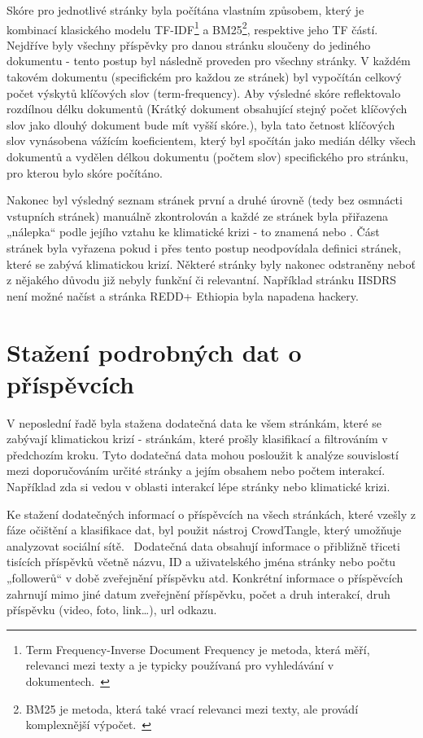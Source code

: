     Skóre pro jednotlivé stránky byla počítána vlastním způsobem, který je kombinací klasického modelu TF-IDF\footnote{Term Frequency-Inverse Document Frequency je metoda, která měří, relevanci mezi texty a je typicky používaná pro vyhledávání v dokumentech.~\citep{ullman2011mining}} a BM25\footnote{BM25 je metoda, která také vrací relevanci mezi texty, ale provádí komplexnější výpočet.~\citep{article}}, respektive jeho TF částí. Nejdříve byly všechny příspěv\-ky pro danou stránku sloučeny do jediného dokumentu - tento postup byl následně proveden pro všechny stránky. V každém takovém dokumentu (specifickém pro každou ze stránek) byl vypočítán celkový počet výskytů klíčových slov (term-frequency). Aby výsledné skóre reflektovalo rozdílnou délku dokumentů (Krátký dokument obsahující stejný počet klíčových slov jako dlouhý dokument bude mít vyšší skóre.), byla tato četnost klíčových slov vynásobena vážícím koeficientem, který byl spočítán jako medián délky všech dokumentů a vydělen délkou dokumentu (počtem slov) specifického pro stránku, pro kterou bylo skóre počítáno. 
    
    Nakonec byl výsledný seznam stránek první a druhé úrovně (tedy bez osmnácti vstupních stránek) manuálně zkontrolován a každé ze stránek byla přiřazena „nálepka“ podle jejího vztahu ke klimatické krizi - to znamená  nebo . Část stránek byla vyřazena pokud i přes tento postup neodpovídala definici stránek, které se zabývá klimatickou krizí. Některé stránky byly nakonec odstraněny neboť z nějakého důvodu již nebyly funkční či relevantní. Například stránku IISDRS není možné načíst a stránka REDD+ Ethiopia byla napadena hackery. 
  
\section{Stažení podrobných dat o příspěvcích}
\label{sec:stazeni-dodatecnych-dat}
    V neposlední řadě byla stažena dodatečná data ke všem stránkám, které se zabývají klimatickou krizí - stránkám, které prošly klasifikací a filtrováním v předchozím kroku. Tyto dodatečná data mohou posloužit k analýze souvislostí mezi doporučováním určité stránky a jejím obsahem nebo počtem interakcí. Například zda si vedou v oblasti interakcí lépe stránky  nebo  klimatické krizi.
    
    Ke stažení dodatečných informací o příspěvcích na všech stránkách, které vzešly z fáze očištění a klasifikace dat, byl použit nástroj CrowdTangle, který umožňuje analyzovat sociální sítě.~\citep{crowdtangle_2021} Dodatečná data obsahují informace o přibližně třiceti tisících příspěvků včetně názvu, ID a uživatel\-ského jména stránky nebo počtu „followerů“ v době zveřejnění příspěvku atd. Konkrétní informace o příspěvcích zahrnují mimo jiné datum zveřejnění příspěvku, počet a druh interakcí, druh příspěvku (video, foto, link\dots), url odkazu.   
  
